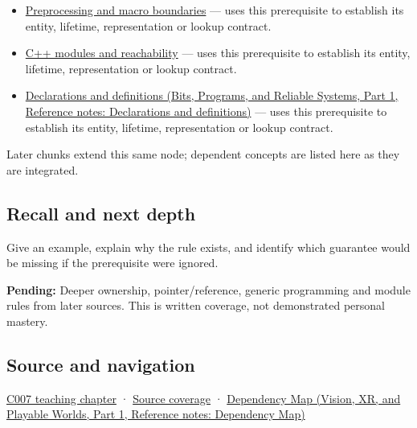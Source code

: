 \hypertarget{appendix-806686359e1b-used-by}{}

\begin{itemize}
\item
  \hyperref[appendix-33c0a92ce855]{Preprocessing and macro boundaries} --- uses this prerequisite to establish its entity, lifetime, representation or lookup contract.
\item
  \hyperref[appendix-410a611a5b8d]{C++ modules and reachability} --- uses this prerequisite to establish its entity, lifetime, representation or lookup contract.
\item
  \href{../01-Bits-Programs-and-Reliable-Systems-P01/main.pdf\#appendix-2e4d494c2d94}{Declarations and definitions (Bits, Programs, and Reliable Systems, Part 1, Reference notes: Declarations and definitions)} --- uses this prerequisite to establish its entity, lifetime, representation or lookup contract.
\end{itemize}

Later chunks extend this same node; dependent concepts are listed here as they are integrated.

\subsection{Recall and next depth}\label{appendix-806686359e1b-recall-and-next-depth}

\hypertarget{appendix-806686359e1b-recall-and-next-depth}{}

Give an example, explain why the rule exists, and identify which guarantee would be missing if the prerequisite were ignored.

\textbf{Pending:} Deeper ownership, pointer/reference, generic programming and module rules from later sources. This is written coverage, not demonstrated personal mastery.

\subsection{Source and navigation}\label{appendix-806686359e1b-source-and-navigation}

\hypertarget{appendix-806686359e1b-source-and-navigation}{}

\hyperref[01-foundations-i-ch002-giving-a-program-a-buildable-shape]{C007 teaching chapter} · \hyperref[appendix-fd090d982a15-m007---parts-101-112]{Source coverage} · \href{../07-Vision-XR-and-Playable-Worlds-P01/main.pdf\#appendix-4ad47bdd269a}{Dependency Map (Vision, XR, and Playable Worlds, Part 1, Reference notes: Dependency Map)}
